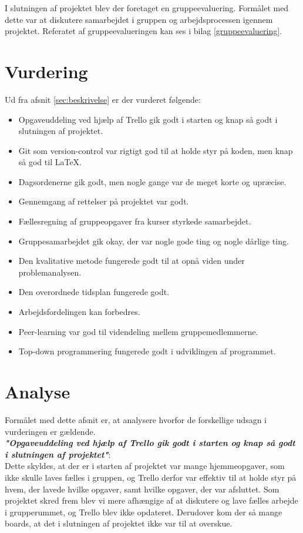 \documentclass[oneside,a4paper,titlepage]{article}
\begin{document}
I slutningen af projektet blev der foretaget en gruppeevaluering. Formålet med dette var at diskutere samarbejdet i gruppen og arbejdsprocessen igennem projektet. Referatet af gruppeevalueringen kan ses i bilag \ref{gruppeevaluering}.

\section{Vurdering}
Ud fra afsnit \ref{sec:beskrivelse} er der vurderet følgende:
\begin{itemize}
  \item Opgaveuddeling ved hjælp af Trello gik godt i starten og knap så godt i slutningen af projektet.
  \item Git som version-control var rigtigt god til at holde styr på koden, men knap så god til LaTeX.
  \item Dagsordenerne gik godt, men nogle gange var de meget korte og upræcise.
  \item Gennemgang af rettelser på projektet var godt.
  \item Fællesregning af gruppeopgaver fra kurser styrkede samarbejdet.
  \item Gruppesamarbejdet gik okay, der var nogle gode ting og nogle dårlige ting. 
  \item Den kvalitative metode fungerede godt til at opnå viden under problemanalysen.
  \item Den overordnede tidsplan fungerede godt.
  \item Arbejdsfordelingen kan forbedres.
  \item Peer-learning var god til videndeling mellem gruppemedlemmerne.
  \item Top-down programmering fungerede godt i udviklingen af programmet.
\end{itemize}

\section{Analyse}
Formålet med dette afsnit er, at analysere hvorfor de forskellige udsagn i vurderingen er gældende. \\

\textbf{\textit{"Opgaveuddeling ved hjælp af Trello gik godt i starten og knap så godt i slutningen af projektet"}}: \\

Dette skyldes, at der er i starten af projektet var mange hjemmeopgaver, som ikke skulle laves fælles i gruppen, og Trello derfor var effektiv til at holde styr på hvem, der lavede hvilke opgaver, samt hvilke opgaver, der var afsluttet. Som projektet skred frem blev vi mere afhængige af at diskutere og lave fælles arbejde i grupperummet, og Trello blev ikke opdateret. Derudover kom der så mange boards, at det i slutningen af projektet ikke var til at overskue. \\
\end{document}
